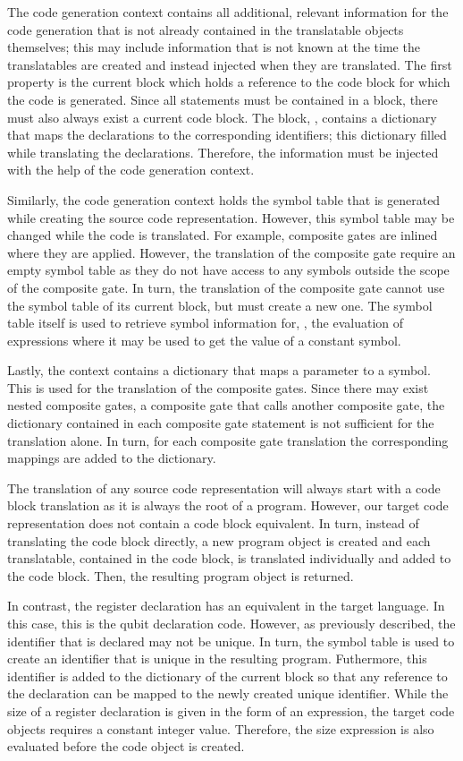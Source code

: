 The code generation context contains all additional, relevant information for the code generation that is not already contained in the translatable objects themselves; this may include information that is not known at the time the translatables are created and instead injected when they are translated. The first property is the current block which holds a reference to the code block for which the code is generated. Since all statements must be contained in a block, there must also always exist a current code block. The block, \eg, contains a dictionary that maps the declarations to the corresponding identifiers; this dictionary filled while translating the declarations. Therefore, the information must be injected with the help of the code generation context. 

Similarly, the code generation context holds the symbol table that is generated while creating the source code representation. However, this symbol table may be changed while the code is translated. For example, composite gates are inlined where they are applied. However, the translation of the composite gate require an empty symbol table as they do not have access to any symbols outside the scope of the composite gate. In turn, the translation of the composite gate cannot use the symbol table of its current block, but must create a new one. The symbol table itself is used to retrieve symbol information for, \eg, the evaluation of expressions where it may be used to get the value of a constant symbol.

Lastly, the context contains a dictionary that maps a parameter to a symbol. This is used for the translation of the composite gates. Since there may exist nested composite gates, \ie a composite gate that calls another composite gate, the dictionary contained in each composite gate statement is not sufficient for the translation alone. In turn, for each composite gate translation the corresponding mappings are added to the dictionary.

The translation of any source code representation will always start with a code block translation as it is always the root of a program. However, our target code representation does not contain a code block equivalent. In turn, instead of translating the code block directly, a new program object is created and each translatable, contained in the code block, is translated individually and added to the code block. Then, the resulting program object is returned.

In contrast, the register declaration has an equivalent in the target language. In this case, this is the qubit declaration code. However, as previously described, the identifier that is declared may not be unique. In turn, the symbol table is used to create an identifier that is unique in the resulting program. Futhermore, this identifier is added to the dictionary of the current block so that any reference to the declaration can be mapped to the newly created unique identifier. While the size of a register declaration is given in the form of an expression, the target code objects requires a constant integer value. Therefore, the size expression is also evaluated before the code object is created. 


